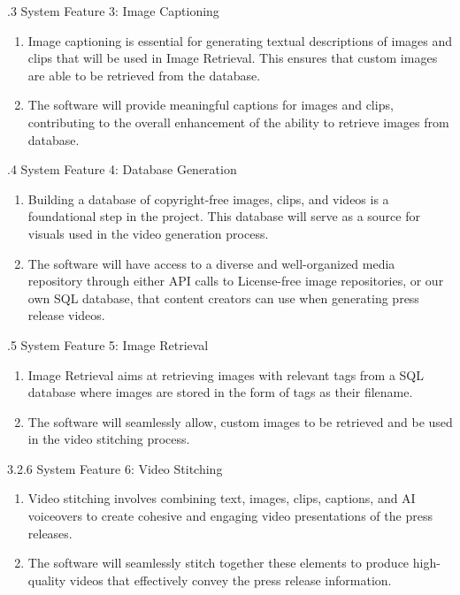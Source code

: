 \documentclass[12pt]{article}
\begin{document}
.3 System Feature 3: Image Captioning
\begin{enumerate}
\def\labelenumi{\arabic{enumi}.}
\item
  Image captioning is essential for generating textual descriptions of images and clips that will be used in Image Retrieval. This ensures that custom images are able to be retrieved from the database.
\item
  The software will provide meaningful captions for images and clips, contributing to the overall enhancement of the ability to retrieve images from database.
\end{enumerate}

.4 System Feature 4: Database Generation

\begin{enumerate}
\def\labelenumi{\arabic{enumi}.}
\item
  Building a database of copyright-free images, clips, and videos is a foundational step in the project. This database will serve as a source for visuals used in the video generation process.
\item
  The software will have access to a diverse and well-organized media repository through either API calls to License-free image repositories, or our own SQL database, that content creators can use when generating press release videos.
\end{enumerate}

.5 System Feature 5: Image Retrieval

\begin{enumerate}
\def\labelenumi{\arabic{enumi}.}
\item
  Image Retrieval aims at retrieving images with relevant tags from a SQL database where images are stored in the form of tags as their filename.
\item
  The software will seamlessly allow, custom images to be retrieved and be used in the video stitching process.
\end{enumerate}

3.2.6 System Feature 6: Video Stitching

\begin{enumerate}
\def\labelenumi{\arabic{enumi}.}
\item
  Video stitching involves combining text, images, clips, captions, and AI voiceovers to create cohesive and engaging video presentations of the press releases.
\item
  The software will seamlessly stitch together these elements to produce high-quality videos that effectively convey the press release information.
\end{enumerate}
\pagebreak{}
\end{document}
